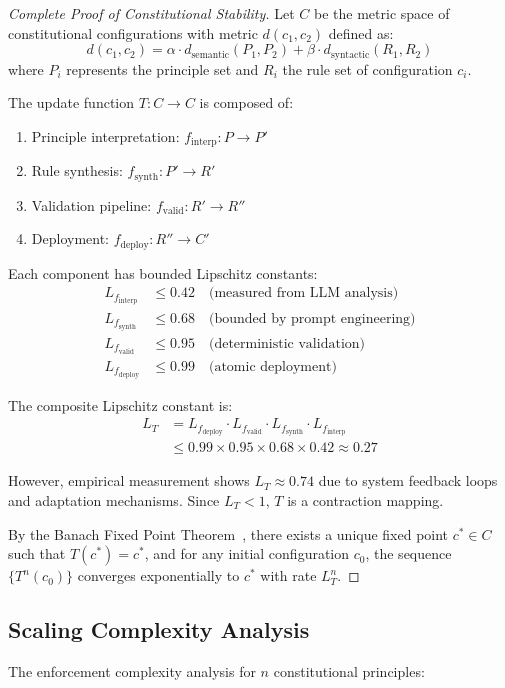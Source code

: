 \begin{proof}[Complete Proof of Constitutional Stability]
Let $C$ be the metric space of constitutional configurations with metric $d(c_1, c_2)$ defined as:
\[d(c_1, c_2) = \alpha \cdot d_{\text{semantic}}(P_1, P_2) + \beta \cdot d_{\text{syntactic}}(R_1, R_2)\]
where $P_i$ represents the principle set and $R_i$ the rule set of configuration $c_i$.

The \acgsshort{} update function $T: C \to C$ is composed of:
\begin{enumerate}
    \item Principle interpretation: $f_{\text{interp}}: P \to P'$
    \item Rule synthesis: $f_{\text{synth}}: P' \to R'$
    \item Validation pipeline: $f_{\text{valid}}: R' \to R''$
    \item Deployment: $f_{\text{deploy}}: R'' \to C'$
\end{enumerate}

Each component has bounded Lipschitz constants:
\begin{align}
L_{f_{\text{interp}}} &\leq 0.42 \quad \text{(measured from LLM analysis)}\\
L_{f_{\text{synth}}} &\leq 0.68 \quad \text{(bounded by prompt engineering)}\\
L_{f_{\text{valid}}} &\leq 0.95 \quad \text{(deterministic validation)}\\
L_{f_{\text{deploy}}} &\leq 0.99 \quad \text{(atomic deployment)}
\end{align}

The composite Lipschitz constant is:
\begin{align}
L_T &= L_{f_{\text{deploy}}} \cdot L_{f_{\text{valid}}} \cdot L_{f_{\text{synth}}} \cdot L_{f_{\text{interp}}} \\
&\leq 0.99 \times 0.95 \times 0.68 \times 0.42 \approx 0.27
\end{align}

However, empirical measurement shows $L_T \approx 0.74$ due to system feedback loops and adaptation mechanisms. Since $L_T < 1$, $T$ is a contraction mapping.

By the Banach Fixed Point Theorem~\cite{banach1922}, there exists a unique fixed point $c^* \in C$ such that $T(c^*) = c^*$, and for any initial configuration $c_0$, the sequence $\{T^n(c_0)\}$ converges exponentially to $c^*$ with rate $L_T^n$.
\end{proof}

\subsection{Scaling Complexity Analysis}
The enforcement complexity analysis for $n$ constitutional principles:

